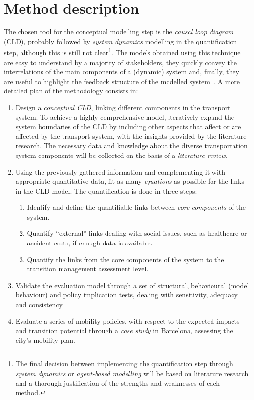 \documentclass[a4paper,fontsize=11pt,bibliography=totoc]{scrartcl}
\begin{document}
\section{Method description}
The chosen tool for the conceptual modelling step is the \textit{causal loop diagram} (CLD), probably followed by \textit{system dynamics} modelling in the quantification step, although this is still not clear\footnote{The final decision between implementing the quantification step through \textit{system dynamics} or \textit{agent-based modelling} will be based on literature research and a thorough justification of the strengths and weaknesses of each method.}. The models obtained using this technique are easy to understand by a majority of stakeholders, they quickly convey the interrelations of the main components of a (dynamic) system and, finally, they are useful to highlight the feedback structure of the modelled system~\parencite{ghosh2015_DynamicSystemsEveryone}. A more detailed plan of the methodology consists in:
%
\begin{enumerate}[label=(\alph*)]
	\item Design a \textit{conceptual CLD}, linking different components in the transport system. To achieve a highly comprehensive model, iteratively expand the system boundaries of the CLD by including other aspects that affect or are affected by the transport system, with the insights provided by the literature research. The necessary data and knowledge about the diverse transportation system components will be collected on the basis of a \textit{literature review}.
	\item Using the previously gathered information and complementing it with appropriate quantitative data, fit as many \textit{equations} as possible for the links in the CLD model. The quantification is done in three steps:
	\begin{enumerate}[label=\roman*.]
		\item Identify and define the quantifiable links between \textit{core components} of the system.
		\item Quantify ``external'' links dealing with social issues, such as healthcare or accident costs, if enough data is available.
		\item Quantify the links from the core components of the system to the transition management assessment level.
	\end{enumerate}
	\item Validate the evaluation model through a set of structural, behavioural (model behaviour) and policy implication tests, dealing with sensitivity, adequacy and consistency.
	\item Evaluate a series of mobility policies, with respect to the expected impacts and transition potential through a \textit{case study} in Barcelona, assessing the city's mobility plan.
\end{enumerate}
\end{document}
